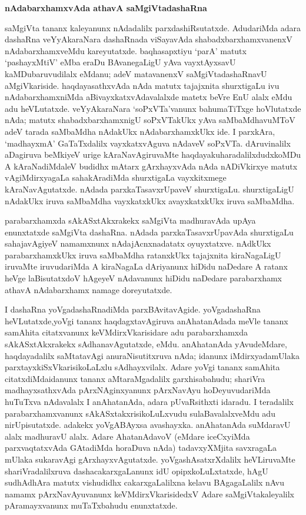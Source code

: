 \smallskip
\begin{center}
{\Large\bf nAdabarxhamxvAda athavA saMgiVtadashaRna}
\end{center}

saMgiVta tananx kaleyanunx nAdadalilx parxdashiRsutatxde. AdudariMda adara dashaRna veYyAkaraNara dashaRnada viSayavAda shabadxbarxhamxvanenxV nAdabarxhamxveMdu kareyutatxde. baqhasapxtiyu `parA' matutx `pashayxMtiV' eMba eraDu BAvanegaLigU yAva vayxtAyxsavU kaMDubaruvudilalx eMdanu; adeV matavanenxV saMgiVtadashaRnavU aMgiVkariside. haqdayasathxvAda nAda matutx tajajxnita shurxtigaLu ivu nAdabarxhamxniMda aBivayxkatxvAdavalalxde matetx beVre EnU alalx eMdu adu heVLutatxde. veYyAkaraNara `soPxVTa'vanunx bahumaTiTxge hoVlutatxde nAda; matutx shabadxbarxhamxnigU soPxVTakUkx yAva saMbaMdhavuMToV adeV tarada saMbaMdha nAdakUkx nAdabarxhamxkUkx ide. I parxkAra, `madhayxmA' GaTaTxdalilx vayxkatxvAguva nAdaveV soPxVTa. dAruvinalilx aDagiruva beMkiyeV urige kAraNavAgiruvaMte haqdayakuharadalilxdudxkoMDu A kAraNadiMdaleV budidhx mAtarx gArxhayxvAda nAda nADiVkirxye matutx vAgiMdirxyagaLa sahakAradiMda shurxtigaLa vayxkitxmege kAraNavAgutatxde. nAdada parxkaTasavxrUpaveV shurxtigaLu. shurxtigaLigU nAdakUkx iruva saMbaMdha vayxkatxkUkx avayxkatxkUkx iruva saMbaMdha.

parabarxhamxda sAkASxtAkxrakekx saMgiVta madhuravAda upAya enunxtatxde saMgiVta dashaRna. nAdada parxkaTasavxrUpavAda shurxtigaLu sahajavAgiyeV namamxnunx nAdajAcnxnadatatx oyuyxtatxve. nAdkUkx parabarxhamxkUkx iruva saMbaMdha ratanxkUkx tajajxnita kiraNagaLigU iruvaMte iruvudariMda A kiraNagaLa dAriyanunx hiDidu naDedare A ratanx heVge laBisutatxdoV hAgeyeV nAdavanunx hiDidu naDedare parabarxhamx athavA nAdabarxhamx namage doreyutatxde.

I dashaRna yoVgadashaRnadiMda parxBAvitavAgide. yoVgadashaRna heVLutatxde,\break yoVgi tananx haqdagxtavAgiruva anAhatanAdada meVle tananx samAhita citatxvanunx keVMdirxV\-karisidare adu parabarxhamxda sAkASxtAkxrakekx sAdhanavAgutatxde, eMdu. anAhatanAda yAvu\break\-deMdare, haqdayadalilx saMtatavAgi anuraNisutitxruva nAda; idanunx iMdirxyada\break mUlaka parxtayxkiSxVkarisikoLaLxlu sAdhayxvilalx. Adare yoVgi tananx samAhita citatxdiMda\break idanunx tananx aMtaraMgadalilx garxhisabahudu; shariVra madhayxsathxvAda pArxNAginxyanunx pArxNa\-vAyu hoDeyuvudariMda huTuTxva nAdavalalx I anAhatanAda, adara pUvaR\-sithxti idaradu. I teradalilx parabarxhamxvanunx sAkASxtakxrisikoLuLxvudu sulaBavalalxveMdu adu nirUpisutatxde. adakekx yoVgABAyxsa avashayxka. anAhatanAda suMdaravU alalx madhu\break\-ravU alalx. Adare AhatanAdavoV (eMdare iceCxyiMda parxvaqtatxvAda GAtadiMda hora\-Duva nAda) tadavxyXMjita savxragaLa mUlaka sukaravAgi gArxhayxvAgutatxde. yoVga\-shAsatxrX\-dalilx heVLiruvaMte shariVradalilxruva dashacakarxgaLanunx idU opipxkoLuLxtatxde, hAgU sudhA\-dhAra matutx vishudidhx cakarxgaLalilxna kelavu BAgagaLalilx nAvu namamx pArxNavAyuvanunx keVMdirxVkari\-sidedxV Adare saMgiVtakaleyalilx pAramayxvanunx muTaTxbahudu enunxtatxde.

